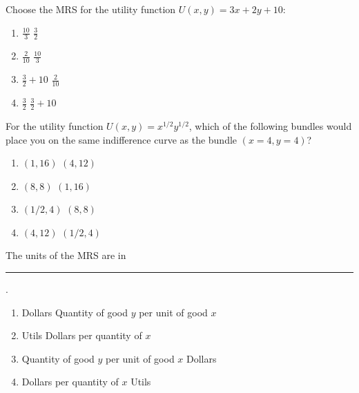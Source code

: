 \begin{question}[type=exam]{4}
  Choose the MRS for the utility function $U(x,y) = 3x + 2y + 10$:
  \begin{enumerate}[label=\alph*), noitemsep]
    \item \vary
      {$\frac{10}{3}$}
      {$\frac{3}{2}$} %
    \item \vary
      {$\frac{2}{10}$}
      {$\frac{10}{3}$}
    \item \vary
      {$\frac{3}{2} + 10$}
      {$\frac{2}{10}$}
    \item \vary
      {$\frac{3}{2}$} %
      {$\frac{3}{2} + 10$}
  \end{enumerate}
\end{question}

\begin{question}[type=exam]{4}
  For the utility function $U(x,y) = x^{1/2}y^{1/2}$, 
  which of the following bundles would place you on the same indifference curve as the bundle $(x=4,y=4)$?
  \begin{enumerate}[label=\alph*), noitemsep]
    \item \vary
    {$(1,16)$} %
    {$(4,12)$}
    \item \vary
    {$(8,8)$}
    {$(1,16)$} %
    \item \vary
    {$(1/2,4)$}
    {$(8,8)$}
    \item \vary
    {$(4,12)$}
    {$(1/2,4)$}
  \end{enumerate}
\end{question}

\begin{question}[type=exam]{4}
  The units of the MRS are in \rule{1cm}{0.15mm}.
  \begin{enumerate}[label=\alph*), noitemsep]
    \item \vary
      {Dollars}
      {Quantity of good $y$ per unit of good $x$} %
    \item \vary
      {Utils}
      {Dollars per quantity of $x$}
    \item \vary
      {Quantity of good $y$ per unit of good $x$} %
      {Dollars}
    \item \vary
      {Dollars per quantity of $x$}
      {Utils}
  \end{enumerate}
\end{question}

